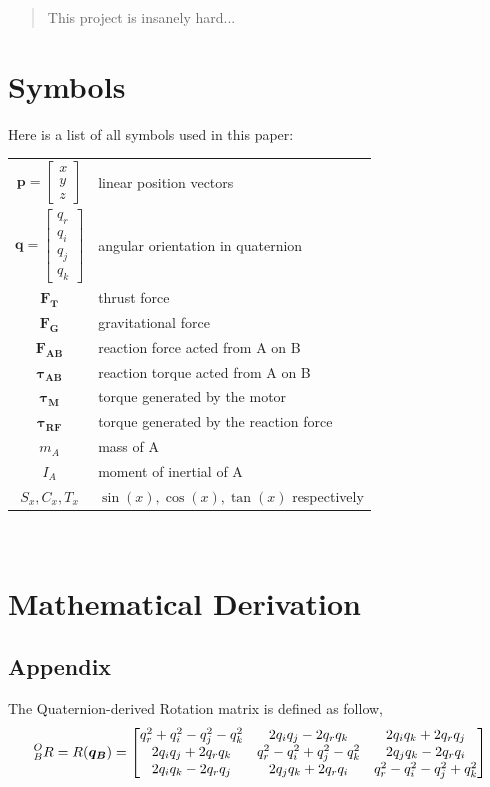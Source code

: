 \begin{abstract}
This project is insanely hard...
\end{abstract}
\section{Symbols}
Here is a list of all symbols used in this paper:
\\
\begin{tabular}{c p{}}
  $\bm{p} = \begin{bmatrix}x \\ y \\ z \end{bmatrix}$ & linear position vectors \\
  $\bm{q} = \begin{bmatrix} q_r \\ q_i \\ q_j \\ q_k \end{bmatrix}$ & angular orientation in quaternion \\
  $\bm{F_{T}}$ & thrust force \\
  $\bm{F_{G}}$ & gravitational force \\  
  $\bm{F_{AB}}$ & reaction force acted from A on B \\
  $\bm{\tau_{AB}}$ & reaction torque acted from A on B \\
  $\bm{\tau_{M}}$ & torque generated by the motor \\
  $\bm{\tau_{RF}}$ & torque generated by the reaction force \\  
  $m_A$ & mass of A \\
  $I_A$ & moment of inertial of A \\
  $S_x, C_x, T_x$ & $\sin(x), \cos(x), \tan(x)$ respectively \\
\end{tabular}\\
\section{Mathematical Derivation}
\subsection{Appendix}
The Quaternion-derived Rotation matrix is defined as follow,
\begin{align*}
  \prescript{O}{B}{R} = R(\bm{q_B}) =
  \begin{bmatrix}
    q_r^2 + q_i^2 - q_j^2 - q_k^2 & 2q_iq_j - 2q_rq_k & 2q_iq_k + 2q_rq_j \\
    2q_iq_j + 2q_rq_k & q_r^2 - q_i^2 + q_j^2 - q_k^2 & 2q_jq_k - 2q_rq_i \\
    2q_iq_k - 2q_rq_j & 2q_jq_k + 2q_rq_i & q_r^2 - q_i^2 - q_j^2 +q_k^2
  \end{bmatrix}
\end{align*}


